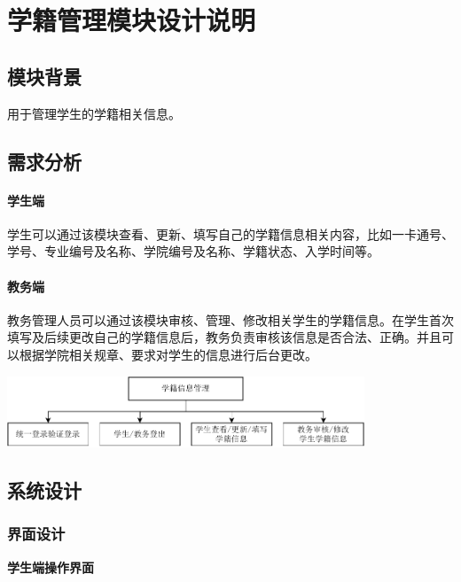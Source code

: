 \documentclass{article}
\begin{document}
\begin{enumerate}
\end{enumerate}

\section{学籍管理模块设计说明}
\subsection{模块背景}
  用于管理学生的学籍相关信息。
\subsection{需求分析}

\paragraph{学生端}
学生可以通过该模块查看、更新、填写自己的学籍信息相关内容，比如一卡通号、学号、专业编号及名称、学院编号及名称、学籍状态、入学时间等。

\paragraph{教务端}
教务管理人员可以通过该模块审核、管理、修改相关学生的学籍信息。在学生首次填写及后续更改自己的学籍信息后，教务负责审核该信息是否合法、正确。并且可以根据学院相关规章、要求对学生的信息进行后台更改。
\begin{center}
\includegraphics[width=0.8\textwidth]{fig/student-status-demand-flowchart.pdf}
\end{center}
\subsection{系统设计}
\subsubsection{界面设计}

\begin{center}
\textbf{学生端操作界面}
\end{center}
\end{document}
